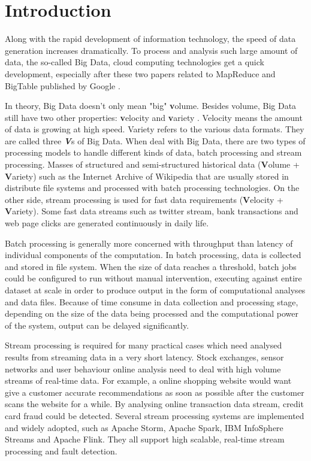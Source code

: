 \chapter{Introduction}
\label{chapter:intro}

Along with the rapid development of information technology, the speed of data generation increases dramatically. To process and analysis such large amount of data, the so-called Big Data,  cloud computing technologies get a quick development,  especially after these two papers related to MapReduce and BigTable published by Google  \cite{chang2006bigtable, dean2008mapreduce}.

In theory, Big Data doesn't only mean "big" \textbf{v}olume. Besides volume, Big Data still have two other properties: \textbf{v}elocity and \textbf{v}ariety \cite{doug2001data}. Velocity means the amount of data is growing at high speed. Variety refers to the various data formats. They are called three \textbf{\textit{V}}s of Big Data.  When deal with Big Data, there are two types of processing models to handle different kinds of data, batch processing and stream processing. Masses of structured and semi-structured historical data (\textbf{V}olume + \textbf{V}ariety) such as the Internet Archive of Wikipedia that are usually stored in distribute file systems and processed with batch processing technologies. On the other side, stream processing is used for fast data requirements (\textbf{V}elocity + \textbf{V}ariety)\cite{GameChanger}. Some fast data streams such as twitter stream, bank transactions and web page clicks are generated continuously in daily life.

Batch processing is generally more concerned with throughput than latency of individual components of the computation. In batch processing, data is collected and stored in file system. When the size of data reaches a threshold, batch jobs could be configured to run without manual intervention, executing against entire dataset at scale in order to produce output in the form of computational analyses and data files. Because of time consume in data collection and processing stage, depending on the size of the data being processed and the computational power of the system, output can be delayed significantly.

Stream processing is required for many practical cases which need analysed results from streaming data in a very short latency. Stock exchanges, sensor networks and user behaviour online analysis need to deal with high volume streams of real-time data. For example, a online shopping website would want give a customer accurate recommendations as soon as possible after the customer scans the website for a while. By analysing online transaction data stream, credit card fraud could be detected. Several stream processing systems are implemented and widely adopted, such as Apache Storm, Apache Spark, IBM InfoSphere Streams and Apache Flink. They all support high scalable, real-time stream processing and fault detection. 


